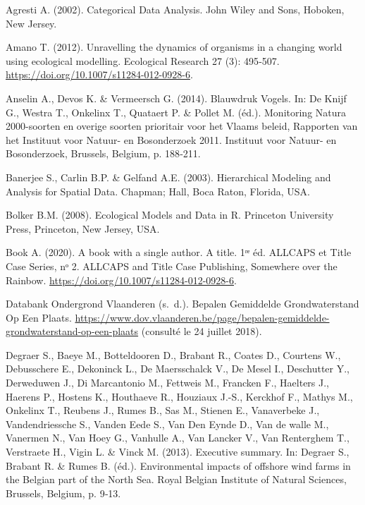 \documentclass[twoside]{extreport}
\begin{document}
\begin{CSLReferences}{1}{0}

\leavevmode{}%
Agresti A. (2002). {Categorical Data Analysis}. John Wiley {and} Sons,
Hoboken, New Jersey.

\leavevmode{}%
Amano T. (2012). {Unravelling the dynamics of organisms in a changing
world using ecological modelling}. Ecological Research 27 (3): 495‑507.
\url{https://doi.org/10.1007/s11284-012-0928-6}.

\leavevmode{}%
Anselin A., Devos K. \& Vermeersch G. (2014). {Blauwdruk Vogels}. In: De
Knijf G., Westra T., Onkelinx T., Quataert P. \& Pollet M. (éd.).
Monitoring Natura 2000-soorten en overige soorten prioritair voor het
Vlaams beleid, Rapporten van het Instituut voor Natuur- en Bosonderzoek
2011. Instituut voor Natuur- en Bosonderzoek, Brussels, Belgium, p.
188‑211.

\leavevmode{}%
Banerjee S., Carlin B.P. \& Gelfand A.E. (2003). {Hierarchical Modeling
and Analysis for Spatial Data}. Chapman; Hall, Boca Raton, Florida, USA.

\leavevmode{}%
Bolker B.M. (2008). {Ecological Models and Data in R}. Princeton
University Press, Princeton, New Jersey, USA.

\leavevmode{}%
Book A. (2020). A book with a single author. A title. 1ʳᵉ éd. ALLCAPS et
{Title Case Series}, nᵒ 2. ALLCAPS {and} Title Case Publishing,
Somewhere over the Rainbow.
\url{https://doi.org/10.1007/s11284-012-0928-6}.

\leavevmode{}%
Databank Ondergrond Vlaanderen (s.~d.). Bepalen Gemiddelde
Grondwaterstand Op Een Plaats.
\url{https://www.dov.vlaanderen.be/page/bepalen-gemiddelde-grondwaterstand-op-een-plaats}
(consulté le 24 juillet 2018).

\leavevmode{}%
Degraer S., Baeye M., Botteldooren D., Brabant R., Coates D., Courtens
W., Debusschere E., Dekoninck L., De Maersschalck V., De Mesel I.,
Deschutter Y., Derweduwen J., Di Marcantonio M., Fettweis M., Francken
F., Haelters J., Haerens P., Hostens K., Houthaeve R., Houziaux J.-S.,
Kerckhof F., Mathys M., Onkelinx T., Reubens J., Rumes B., Sas M.,
Stienen E., Vanaverbeke J., Vandendriessche S., Vanden Eede S., Van Den
Eynde D., Van de walle M., Vanermen N., Van Hoey G., Vanhulle A., Van
Lancker V., Van Renterghem T., Verstraete H., Vigin L. \& Vinck M.
(2013). {Executive summary}. In: Degraer S., Brabant R. \& Rumes B.
(éd.). Environmental impacts of offshore wind farms in the Belgian part
of the North Sea. Royal Belgian Institute of Natural Sciences, Brussels,
Belgium, p. 9‑13.


\end{CSLReferences}
\end{document}
